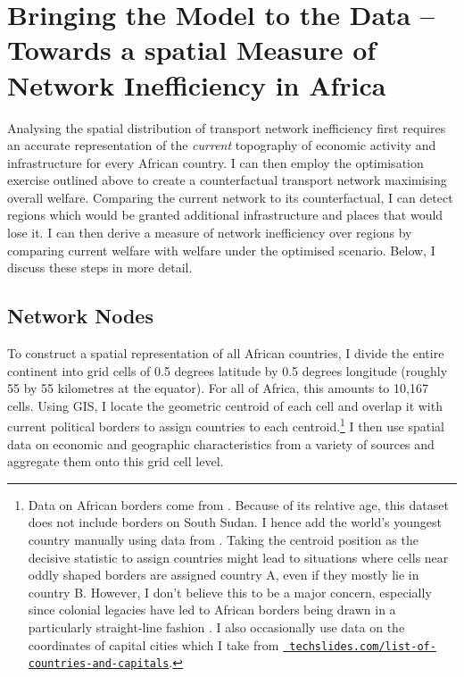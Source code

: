 \documentclass[11pt, oneside]{article}   	%
\begin{document}
\section{Bringing the Model to the Data -- Towards a spatial Measure of Network Inefficiency in Africa}
\label{chapter:calibration}
Analysing the spatial distribution of transport network inefficiency first requires an accurate representation of the \emph{current} topography of economic activity and infrastructure for every African country. I can then employ the \cite{fajgelbaum_optimal_2017} optimisation exercise outlined above to create a counterfactual transport network maximising overall welfare. Comparing the current network to its counterfactual, I can detect regions which would be granted additional infrastructure and places that would lose it. I can then derive a measure of network inefficiency over regions by comparing current welfare with welfare under the optimised scenario. Below, I discuss these steps in more detail.

\subsection{Network Nodes}

To construct a spatial representation of all African countries, I divide the entire continent into grid cells of 0.5 degrees latitude by 0.5 degrees longitude (roughly 55 by 55 kilometres at the equator). For all of Africa, this amounts to 10,167 cells. Using GIS, I locate the geometric centroid of each cell and overlap it with current political borders to assign countries to each centroid.\footnote{Data on African borders come from \cite{Sandvik_WorldBordersDataset_2008}. Because of its relative age, this dataset does not include borders on South Sudan. I hence add the world's youngest country manually using data from \cite{OCHA_SouthSudanAdministrative_2017}. Taking the centroid position as the decisive statistic to assign countries might lead to situations where cells near oddly shaped borders are assigned country A, even if they mostly lie in country B. However, I don't believe this to be a major concern, especially since colonial legacies have led to African borders being drawn in a particularly straight-line fashion \citep[see][]{Alesina_ArtificialStates_2011}. I also occasionally use data on the coordinates of capital cities which I take from \href{http://techslides.com/list-of-countries-and-capitals}{\texttt{ techslides.com/list-of-countries-and-capitals}}.} I then use spatial data on economic and geographic characteristics from a variety of sources and aggregate them onto this grid cell level.
\end{document}
